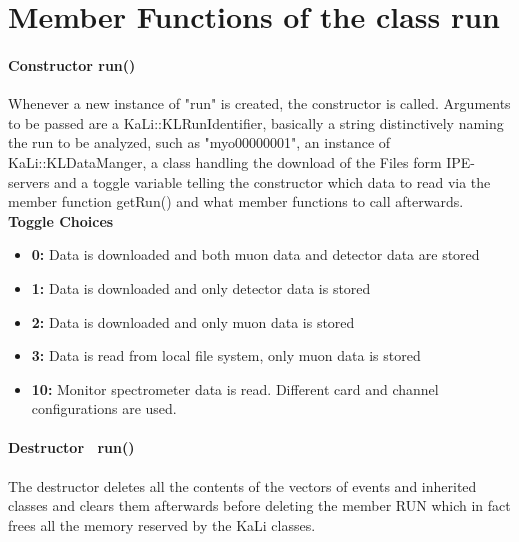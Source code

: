   \section{Member Functions of the class {\bf run}}
  \label{ch:Analysis software:sec:methods of the class run}
  
    \paragraph{Constructor run()}
    \label{ch:Analysis software:sec:methods of the class run:subsec:Constructor}
    Whenever a new instance of "run" is created, the constructor is called. Arguments to be passed are a KaLi::KLRunIdentifier, basically a string distinctively naming the run to be analyzed, such as "myo00000001", an instance of KaLi::KLDataManger, a class handling the download of the Files form IPE-servers and a toggle variable telling the constructor which data to read via the member function getRun() and what member functions to call afterwards.\\
    {\bf Toggle Choices}
    	\begin{itemize}
    		\item {\bf 0:} Data is downloaded and both muon data and detector data are stored
    		\item {\bf 1:} Data is downloaded and only detector data is stored
    		\item {\bf 2:} Data is downloaded and only muon data is stored
    		\item {\bf 3:} Data is read from local file system, only muon data is stored
    		\item {\bf  10:} Monitor spectrometer data is read. Different card and channel configurations are used.
    	
    	\end{itemize}

    
    \paragraph{Destructor ~run()}
    \label{ch:Analysis software:sec:methods of the class run:subsec:destructor}
    The destructor deletes all the contents of the vectors of events and inherited classes and clears them afterwards before deleting the member RUN which in fact frees all the memory reserved by the KaLi classes.
    
